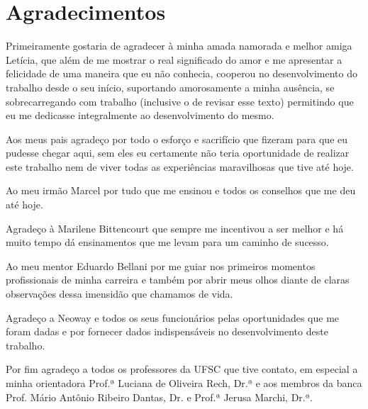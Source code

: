 \chapter*{Agradecimentos}

Primeiramente gostaria de agradecer à minha amada namorada e melhor
amiga Letícia, que além de me mostrar o real significado do amor e
me apresentar a felicidade de uma maneira que eu não conhecia,
cooperou no desenvolvimento do trabalho desde o seu início, suportando
amorosamente a minha ausência, se sobrecarregando com trabalho
(inclusive o de revisar esse texto) permitindo que eu me dedicasse
integralmente ao desenvolvimento do mesmo.

Aos meus pais agradeço por todo o esforço e sacrifício que fizeram
para que eu pudesse chegar aqui, sem eles eu certamente não teria
oportunidade de realizar este trabalho nem de viver todas as
experiências maravilhosas que tive até hoje.

Ao meu irmão Marcel por tudo que me ensinou e todos os conselhos que
me deu até hoje.

Agradeço à Marilene Bittencourt que sempre me incentivou a ser melhor
e há muito tempo dá ensinamentos que me levam para um caminho de
sucesso.

Ao meu mentor Eduardo Bellani por me guiar nos primeiros momentos
profissionais de minha carreira e também por abrir meus olhos diante
de claras observações dessa imensidão que chamamos de vida.

Agradeço a Neoway e todos os seus funcionários pelas oportunidades que
me foram dadas e por fornecer dados indispensáveis no desenvolvimento
deste trabalho.

Por fim agradeço a todos os professores da UFSC que tive contato, em
especial a minha orientadora Prof.ª Luciana de Oliveira Rech, Dr.ª e aos
membros da banca Prof. Mário Antônio Ribeiro Dantas, Dr. e Prof.ª 
Jerusa Marchi, Dr.ª.